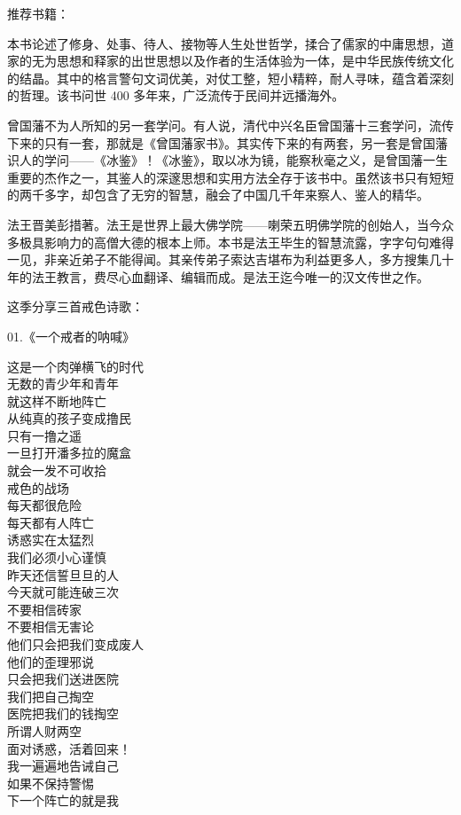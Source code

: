 推荐书籍：

\begin{book}[《菜根谭》]
    本书论述了修身、处事、待人、接物等人生处世哲学，揉合了儒家的中庸思想，道家的无为思想和释家的出世思想以及作者的生活体验为一体，是中华民族传统文化的结晶。其中的格言警句文词优美，对仗工整，短小精粹，耐人寻味，蕴含着深刻的哲理。该书问世 400 多年来，广泛流传于民间并远播海外。
\end{book}

\begin{book}[《冰鉴》，曾国藩]
    曾国藩不为人所知的另一套学问。有人说，清代中兴名臣曾国藩十三套学问，流传下来的只有一套，那就是《曾国藩家书》。其实传下来的有两套，另一套是曾国藩识人的学问——《冰鉴》！《冰鉴》，取以冰为镜，能察秋毫之义，是曾国藩一生重要的杰作之一，其鉴人的深邃思想和实用方法全存于该书中。虽然该书只有短短的两千多字，却包含了无穷的智慧，融会了中国几千年来察人、鉴人的精华。
\end{book}

\begin{book}[《不离》]
    法王晋美彭措著。法王是世界上最大佛学院——喇荣五明佛学院的创始人，当今众多极具影响力的高僧大德的根本上师。本书是法王毕生的智慧流露，字字句句难得一见，非亲近弟子不能得闻。其亲传弟子索达吉堪布为利益更多人，多方搜集几十年的法王教言，费尽心血翻译、编辑而成。是法王迄今唯一的汉文传世之作。
\end{book}


这季分享三首戒色诗歌：

\begin{center}
    01.《一个戒者的呐喊》\it
    \begin{multicols}{2}
        这是一个肉弹横飞的时代 \\ 无数的青少年和青年 \\ 就这样不断地阵亡 \\ 从纯真的孩子变成撸民 \\ 只有一撸之遥 \\ 一旦打开潘多拉的魔盒 \\ 就会一发不可收拾 \\ 戒色的战场 \\ 每天都很危险 \\ 每天都有人阵亡 \\ 诱惑实在太猛烈 \\ 我们必须小心谨慎 \\ 昨天还信誓旦旦的人 \\ 今天就可能连破三次 \\ 不要相信砖家 \\ 不要相信无害论 \\ 他们只会把我们变成废人 \\ 他们的歪理邪说 \\ 只会把我们送进医院 \\ 我们把自己掏空 \\ 医院把我们的钱掏空 \\ 所谓人财两空 \\ 面对诱惑，活着回来！ \\ 我一遍遍地告诫自己 \\ 如果不保持警惕 \\ 下一个阵亡的就是我
    \end{multicols}
\end{center}



